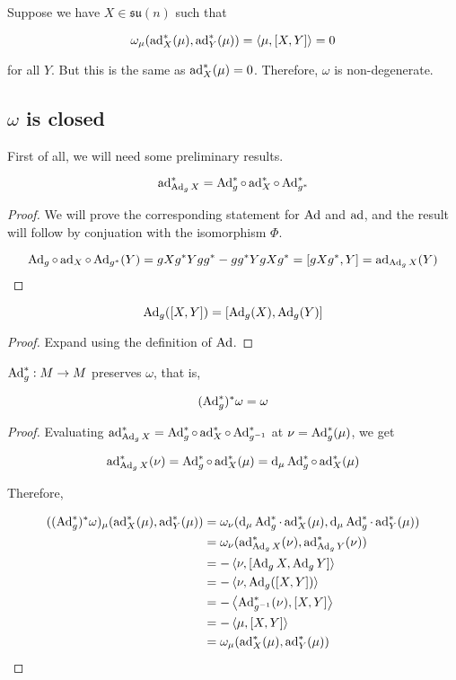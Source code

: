 \documentclass{article}
\newcommand{\su}{\mathfrak{su}}
\begin{document}
Suppose we have \(X \in \su(n)\) such that

\[\omega_\mu(\operatorname{ad}_X^*(\mu), \operatorname{ad}_Y^*(\mu)) = \left\langle \mu, [X, Y] \right\rangle = 0\]

for all \(Y\). But this is the same as \(\operatorname{ad}_X^*(\mu) = 0\). Therefore, \(\omega\) is non-degenerate.

\subsection{\(\omega\) is closed}

First of all, we will need some preliminary results.

\begin{lemma}
    \label{lem:ad_Ad}
    \[\operatorname{ad}_{\operatorname{Ad}_gX}^* = \operatorname{Ad}_g^* \circ \operatorname{ad}_X^* \circ \operatorname{Ad}_{g^*}^*\]
\end{lemma}

\begin{proof}
    We will prove the corresponding statement for \(\operatorname{Ad}\) and \(\operatorname{ad}\), and the result will follow by conjuation with the isomorphism \(\Phi\).

    \[\operatorname{Ad}_g \circ \operatorname{ad}_X \circ \operatorname{Ad}_{g^*}(Y)= gX g^* Y g g^* - g g^* Y g X g^* = [gX g^*, Y] = \operatorname{ad}_{\operatorname{Ad}_gX}(Y)\]
\end{proof}

\begin{lemma}
    \[\operatorname{Ad}_g([X, Y]) = [\operatorname{Ad}_g(X), \operatorname{Ad}_g(Y)]\]
\end{lemma}

\begin{proof}
    Expand using the definition of \(\operatorname{Ad}\).
\end{proof}

\begin{lemma}
    \(\operatorname{Ad}_g^* :  M \to  M\) preserves \(\omega\), that is,

    \[(\operatorname{Ad}_g^*)^*\omega = \omega\]
\end{lemma}

\begin{proof}
    Evaluating \(\operatorname{ad}^*_{\operatorname{Ad}_gX} = \operatorname{Ad}_g^* \circ \operatorname{ad}_X^* \circ \operatorname{Ad}_{g^{-1}}^*\) at \(\nu = \operatorname{Ad}_g^*(\mu)\), we get

    \[\operatorname{ad}^*_{\operatorname{Ad}_gX}(\nu) = \operatorname{Ad}_g^* \circ \operatorname{ad}_X^*(\mu) = \dd_\mu\operatorname{Ad}_g^* \circ \operatorname{ad}_X^*(\mu)\]

    Therefore,

    \begin{align*}
        ((\operatorname{Ad}_g^*)^*\omega)_\mu(\operatorname{ad}_X^*(\mu), \operatorname{ad}_Y^*(\mu)) &= \omega_\nu(\dd_\mu \operatorname{Ad}_g^* \cdot \operatorname{ad}_X^*(\mu), \dd_\mu \operatorname{Ad}_g^* \cdot \operatorname{ad}_Y^*(\mu)) \\
        &= \omega_\nu(\operatorname{ad}^*_{\operatorname{Ad}_gX}(\nu), \operatorname{ad}^*_{\operatorname{Ad}_gY}(\nu)) \\
        &= -\left\langle \nu, [\operatorname{Ad}_gX, \operatorname{Ad}_gY] \right\rangle \\
        &= -\left\langle \nu, \operatorname{Ad}_g([X, Y]) \right\rangle \\
        &= -\left\langle \operatorname{Ad}_{g^{-1}}^*(\nu), [X, Y] \right\rangle \\
        &= -\left\langle \mu, [X, Y] \right\rangle \\
        &= \omega_\mu(\operatorname{ad}_X^*(\mu), \operatorname{ad}_Y^*(\mu))
    \end{align*}
\end{proof}
\end{document}
